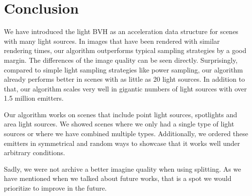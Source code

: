 
\chapter{Conclusion}
\label{ch:Conclusion}

We have introduced the light BVH as an acceleration data structure for scenes with many light sources. In images that have been rendered with similar rendering times, our algorithm outperforms typical sampling strategies by a good margin. The differences of the image quality can be seen directly. Surprisingly, compared to simple light sampling strategies like power sampling, our algorithm already performs better in scenes with as little as 20 light sources. In addition to that, our algorithm scales very well in gigantic numbers of light sources with over 1.5 million emitters.

Our algorithm works on scenes that include point light sources, spotlights and area light sources. We showed scenes where we only had a single type of light sources or where we have combined multiple types. Additionally, we ordered these emitters in symmetrical and random ways to showcase that it works well under arbitrary conditions.

Sadly, we were not archive a better imagine quality when using splitting. As we have mentioned when we talked about future works, that is a spot we would prioritize to improve in the future.